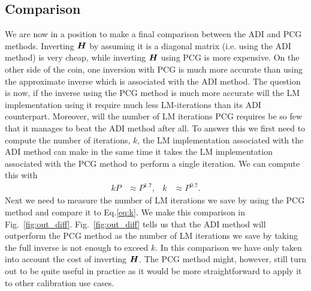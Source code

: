 \documentclass[useAMS,usenatbib]{mn2e}
\newcommand{\bH}{\bmath{H}}
\begin{document}
\subsection{Comparison}
\label{sec:comparison}
We are now in a position to make a final comparison between the ADI and PCG methods. Inverting $\bH$ by assuming it is a diagonal matrix (i.e. using the ADI method) is very cheap, while inverting $\bH$ using PCG is more expensive. On the other side of the coin,  one inversion with PCG is much more 
accurate than using the approximate inverse which is associated with the ADI method. The question is now, if the inverse using the PCG method is much more accurate will the LM implementation using it require much less LM-iterations than its ADI counterpart. Moreover, will the number 
of LM iterations PCG requires be so few that it manages to beat the ADI method after all. To answer this we first need to compute the number of iterations, $k$, the LM implementation associated with the ADI method can make in the 
same time it takes the LM implementation associated with the PCG method to perform a single iteration. We can compute this with
\begin{align}
\label{eq:k}
 kP &\approx P^{1.7}, & k &\approx P^{0.7}.
\end{align}
Next we need to measure the number of LM iterations we save by using the PCG method and compare it to Eq.\eqref{eq:k}. We make this comparison 
in Fig.~\ref{fig:out_diff}. Fig.~\ref{fig:out_diff} tells us that the ADI method will outperform the PCG method as the number of LM iterations we save by taking the 
full inverse is not enough to exceed $k$. In this comparison we have only taken into account the cost of inverting $\bH$. The PCG method might, however, still 
turn out to be quite useful in practice as it would be more straightforward to apply it to other calibration use cases.
\end{document}
